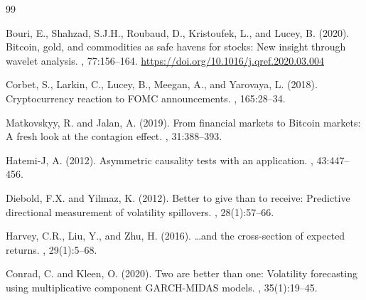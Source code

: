 \documentclass[11pt,a4paper]{article}
\begin{document}
\begin{thebibliography}{99}

Bouri, E., Shahzad, S.J.H., Roubaud, D., Kristoufek, L., and Lucey, B. (2020).
\newblock Bitcoin, gold, and commodities as safe havens for stocks: New insight through wavelet analysis.
, 77:156--164.
\newblock \url{https://doi.org/10.1016/j.qref.2020.03.004}

Corbet, S., Larkin, C., Lucey, B., Meegan, A., and Yarovaya, L. (2018).
\newblock Cryptocurrency reaction to FOMC announcements.
, 165:28--34.

Matkovskyy, R. and Jalan, A. (2019).
\newblock From financial markets to Bitcoin markets: A fresh look at the contagion effect.
, 31:388--393.

Hatemi-J, A. (2012).
\newblock Asymmetric causality tests with an application.
, 43:447--456.

Diebold, F.X. and Yilmaz, K. (2012).
\newblock Better to give than to receive: Predictive directional measurement of volatility spillovers.
, 28(1):57--66.

Harvey, C.R., Liu, Y., and Zhu, H. (2016).
\newblock \ldots and the cross-section of expected returns.
, 29(1):5--68.

Conrad, C. and Kleen, O. (2020).
\newblock Two are better than one: Volatility forecasting using multiplicative component GARCH-MIDAS models.
, 35(1):19--45.

\end{thebibliography}
\end{document}
